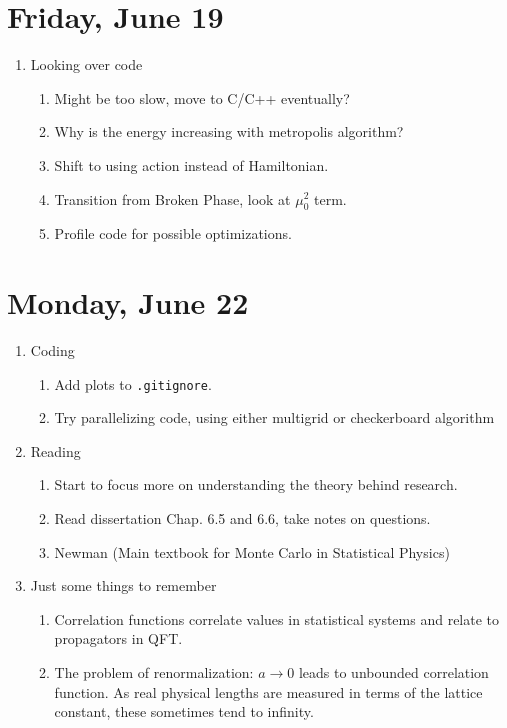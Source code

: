 \documentclass[english]{article}
\begin{document}
\section{Friday, June 19}
    \begin{enumerate}
        \item Looking over code
        \begin{enumerate}
            \item Might be too slow, move to C/C++ eventually?
            \item Why is the energy increasing with metropolis algorithm?
            \item Shift to using action instead of Hamiltonian.
            \item Transition from Broken Phase, look at $\mu_0^2$ term.
            \item Profile code for possible optimizations. %
        \end{enumerate}
    \end{enumerate}

 \section{Monday, June 22}
    \begin{enumerate}
        \item Coding
        \begin{enumerate}
            \item Add plots to \texttt{.gitignore}.
            \item Try parallelizing code, using either multigrid or checkerboard algorithm
        \end{enumerate}

        \item Reading
        \begin{enumerate}
            \item Start to focus more on understanding the theory behind research.
            \item Read dissertation \cite{Schaich2006} Chap. 6.5 and 6.6, take notes on questions.
            \item Newman \cite{Newman1999} (Main textbook for Monte Carlo in Statistical Physics)
        \end{enumerate}

        \item Just some things to remember
        \begin{enumerate}
            \item Correlation functions correlate values in statistical systems and relate to propagators in QFT.
            \item The problem of renormalization: $a\rightarrow0$ leads to unbounded correlation function. As real physical lengths are measured in terms of the lattice constant, these sometimes tend to infinity.
        \end{enumerate}
    \end{enumerate}


\nocite{*}


\end{document}
